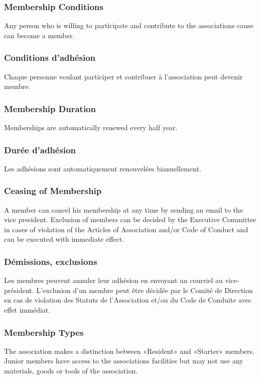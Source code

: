 \documentclass[12pt,a4paper,oneside]{article}
\newcounter{art}
\newcommand{\english}{    \switchcolumn[0]\noindent}
\newcommand{\french}{    \switchcolumn[1]\noindent}
\begin{document}
\begin{paracol}{2}
\english
	\subsubsection{Membership Conditions}
	Any person who is willing to participate and contribute to the associations cause can become a member.

\french
	\subsubsection{Conditions d’adhésion}
	Chaque personne voulant participer et contribuer à l’association peut devenir membre.

\english
	\subsubsection{Membership Duration}
	Memberships are automatically renewed every half year.

\french
	\subsubsection{Durée d’adhésion}
	Les adhésions sont automatiquement renouvelées bianuellement.



\english
	\subsubsection{Ceasing of Membership}
	A member can cancel his membership at any time by sending an email to the vice president. Exclusion of members can be decided by the Executive Committee in cases of violation of the Articles of Association and/or Code of Conduct and can be executed with immediate effect.

\french
	\subsubsection{Démissions, exclusions}
	Les membres peuvent annuler leur adhésion en envoyant un courriel au vice-président. 
	L’exclusion d’un membre peut être décidée par le Comité de Direction en cas de violation des Statuts de l’Association et/ou du Code de Conduite avec effet immédiat.



\english
	\subsubsection{Membership Types}
	The association makes a distinction between «Resident» and «Starter» members.
	Junior members have access to the associations facilities but may not use any materials, goods or tools of the association. 


\end{paracol}
\end{document}
